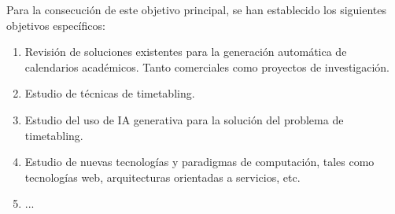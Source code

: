 Para la consecución de este objetivo principal, se han establecido los siguientes objetivos específicos:
\begin{enumerate}
    \item Revisión de soluciones existentes para la generación automática de calendarios académicos. Tanto comerciales como proyectos de investigación.
    \item Estudio de técnicas de timetabling.
    \item Estudio del uso de IA generativa para la solución del problema de timetabling.
    \item Estudio de nuevas tecnologías y paradigmas de computación, tales como tecnologías web, arquitecturas orientadas a servicios, etc.
    \item ...
\end{enumerate}